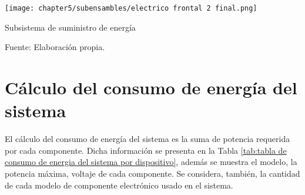 \begin{myfigure}[H]
	\footnotesize\centering
	\texttt{[image: chapter5/subensambles/electrico frontal 2 final.png]}
	\caption{Subsistema de suministro de energía}
	\begin{myflushcenter}
		Fuente: Elaboración propia.
	\end{myflushcenter}
	\label{fig:subsistema de suministro de energia}
\end{myfigure}


\section{Cálculo del consumo de energía del sistema} 

El cálculo del consumo de energía del sistema es la suma de potencia requerida por cada componente. Dicha información se presenta en la Tabla \ref{tab:tabla de consumo de energia del sistema por dispositivo}, además se muestra el modelo, la potencia máxima, voltaje de cada componente. Se considera, también, la cantidad de cada modelo de componente electrónico usado en el sistema.


